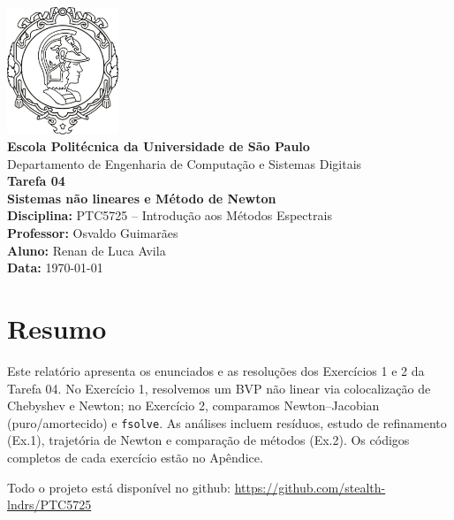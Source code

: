 \documentclass[12pt,a4paper]{article}
\begin{document}
\begin{titlepage}
    \begin{center}
        \includegraphics[width=0.25\textwidth]{EP.jpg}\\[1cm]
        {\Large \textbf{Escola Politécnica da Universidade de São Paulo}}\\[0.2cm]
        {\large Departamento de Engenharia de Computação e Sistemas Digitais}\\[2.0cm]
        {\Huge \textbf{Tarefa 04}}\\[0.4cm]
        {\Large \textbf{Sistemas não lineares e Método de Newton}}\\[2.0cm]
        {\large \textbf{Disciplina:} PTC5725 -- Introdução aos Métodos Espectrais}\\[0.3cm]
        {\large \textbf{Professor:} Osvaldo Guimarães}\\[0.3cm]
        {\large \textbf{Aluno:} Renan de Luca Avila}\\[0.3cm]
        {\large \textbf{Data:} \today}\\[2.5cm]
        \vfill
    \end{center}
\end{titlepage}

\tableofcontents
\newpage

\section*{Resumo}
Este relatório apresenta os enunciados e as resoluções dos Exercícios 1 e 2 da Tarefa 04. 
No Exercício 1, resolvemos um BVP não linear via colocalização de Chebyshev e Newton; no Exercício 2, comparamos Newton--Jacobian (puro/amortecido) e \texttt{fsolve}. 
As análises incluem resíduos, estudo de refinamento (Ex.1), trajetória de Newton e comparação de métodos (Ex.2). 
Os códigos completos de cada exercício estão no Apêndice.

Todo o projeto está disponível no github: \href{https://github.com/stealth-lndrs/PTC5725}{https://github.com/stealth-lndrs/PTC5725}
\end{document}
